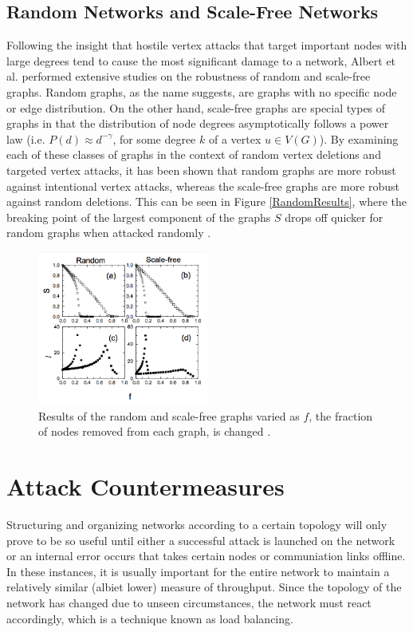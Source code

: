 \documentclass[11pt]{article}
\begin{document}
\subsection{Random Networks and Scale-Free Networks}
Following the insight that hostile vertex attacks that target important nodes with large degrees tend to cause the most significant damage to a network, Albert et al. performed extensive studies on the robustness of random and scale-free graphs. Random graphs, as the name suggests, are graphs with no specific node or edge distribution. On the other hand, scale-free graphs are special types of graphs in that the distribution of node degrees asymptotically follows a power law (i.e. $P(d) \approx d^{-\gamma}$, for some degree $k$ of a vertex $u \in V(G)$). By examining each of these classes of graphs in the context of random vertex deletions and targeted vertex attacks, it has been shown that random graphs are more robust against intentional vertex attacks, whereas the scale-free graphs are more robust against random deletions. This can be seen in Figure \ref{RandomResults}, where the breaking point of the largest component of the graphs $S$ drops off quicker for random graphs when attacked randomly \cite{GraphThesis}. 

\begin{figure}[h!]
	\label{fig:RandomResults}
	\centering
		\includegraphics[width=0.5\textwidth]{random_results.png}
	\caption{Results of the random and scale-free graphs varied as $f$, the fraction of nodes removed from each graph, is changed \cite{GraphThesis}. }
\end{figure}


\section{Attack Countermeasures}
Structuring and organizing networks according to a certain topology will only prove to be so useful until either a successful attack is launched on the network or an internal error occurs that takes certain nodes or communiation links offline. In these instances, it is usually important for the entire network to maintain a relatively similar (albiet lower) measure of throughput. Since the topology of the network has changed due to unseen circumstances, the network must react accordingly, which is a technique known as load balancing. 
\end{document}
